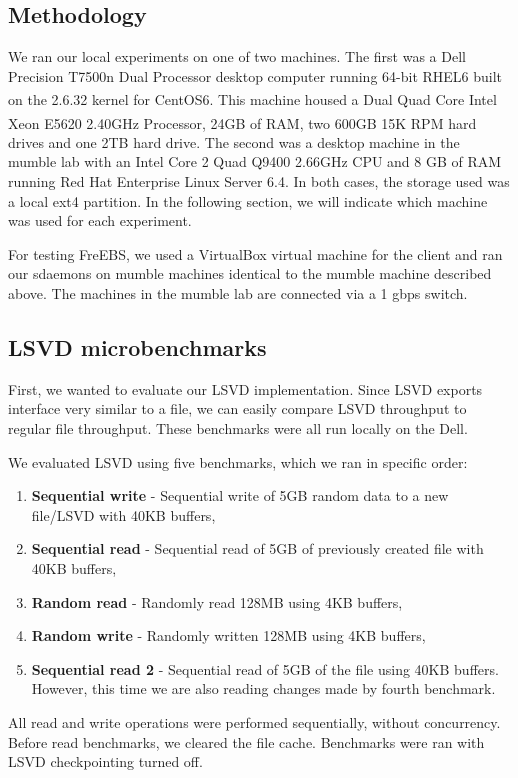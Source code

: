 \subsection{Methodology}
We ran our local experiments on one of two machines. The first was a Dell Precision T7500n Dual Processor desktop 
computer running 64-bit RHEL6 built on the 2.6.32 kernel for CentOS6. This 
machine housed a Dual Quad Core Intel\textsuperscript{\textregistered} 
Xeon\textsuperscript{\textregistered} E5620 2.40GHz Processor, 24GB of RAM, 
two 600GB 15K RPM hard drives and one 2TB hard drive. The second was a desktop machine in the mumble lab with an Intel Core 2 Quad Q9400 2.66GHz CPU and 8 GB of RAM running Red Hat Enterprise Linux Server 6.4. In both cases, the storage used was a local ext4 partition. In the following section, we will indicate which machine was used for each experiment.

For testing FreEBS, we used a VirtualBox virtual machine for the client and ran our sdaemons on mumble machines identical to the mumble machine described above. The machines in the mumble lab are connected via a 1 gbps switch.

\subsection{LSVD microbenchmarks}
First, we wanted to evaluate our LSVD implementation. Since LSVD exports interface very similar to a file, we can easily compare LSVD throughput to regular file throughput. These benchmarks were all run locally on the Dell.

We evaluated LSVD using five benchmarks, which we ran in specific order:
\begin{enumerate}
\item \textbf{Sequential write} - Sequential write of 5GB random data to a new file/LSVD with 40KB buffers,
\item \textbf{Sequential read} - Sequential read of 5GB of previously created file with 40KB buffers,
\item \textbf{Random read} - Randomly read 128MB using 4KB buffers,
\item \textbf{Random write} - Randomly written 128MB using 4KB buffers,
\item \textbf{Sequential read 2} - Sequential read of 5GB of the file using 40KB buffers. However, this time we are also reading changes made by fourth benchmark.
\end{enumerate}

All read and write operations were performed sequentially, without concurrency. Before read benchmarks, we cleared the file cache. Benchmarks were ran with LSVD checkpointing turned off.


